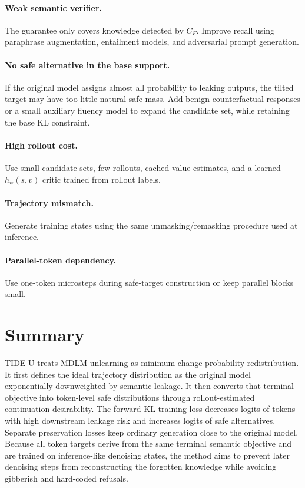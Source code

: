 \documentclass[10pt]{article}
\newcommand{\1}{\mathbb{I}}
\begin{document}
\paragraph{Weak semantic verifier.}
The guarantee only covers knowledge detected by $C_F$. Improve recall using paraphrase augmentation, entailment models, and adversarial prompt generation.

\paragraph{No safe alternative in the base support.}
If the original model assigns almost all probability to leaking outputs, the tilted target may have too little natural safe mass. Add benign counterfactual responses or a small auxiliary fluency model to expand the candidate set, while retaining the base KL constraint.

\paragraph{High rollout cost.}
Use small candidate sets, few rollouts, cached value estimates, and a learned $h_\psi(s,v)$ critic trained from rollout labels.

\paragraph{Trajectory mismatch.}
Generate training states using the same unmasking/remasking procedure used at inference.

\paragraph{Parallel-token dependency.}
Use one-token microsteps during safe-target construction or keep parallel blocks small.

\section{Summary}

TIDE-U treats MDLM unlearning as minimum-change probability redistribution. It first defines the ideal trajectory distribution as the original model exponentially downweighted by semantic leakage. It then converts that terminal objective into token-level safe distributions through rollout-estimated continuation desirability. The forward-KL training loss decreases logits of tokens with high downstream leakage risk and increases logits of safe alternatives. Separate preservation losses keep ordinary generation close to the original model. Because all token targets derive from the same terminal semantic objective and are trained on inference-like denoising states, the method aims to prevent later denoising steps from reconstructing the forgotten knowledge while avoiding gibberish and hard-coded refusals.
\end{document}
